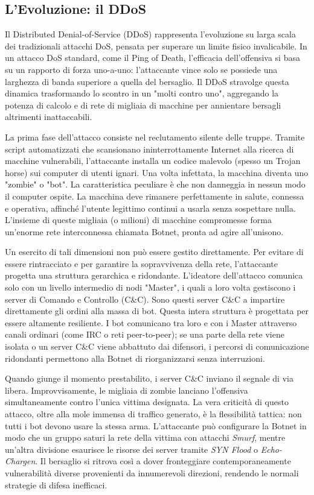 \documentclass{article}
\begin{document}
\subsection*{L'Evoluzione: il DDoS}

Il Distributed Denial-of-Service (DDoS) rappresenta l'evoluzione su larga scala dei tradizionali attacchi DoS, pensata per superare un limite fisico invalicabile. In un attacco DoS standard, come il Ping of Death, l'efficacia dell'offensiva si basa su un rapporto di forza uno-a-uno: l'attaccante vince solo se possiede una larghezza di banda superiore a quella del bersaglio. Il DDoS stravolge questa dinamica trasformando lo scontro in un "molti contro uno", aggregando la potenza di calcolo e di rete di migliaia di macchine per annientare bersagli altrimenti inattaccabili.

La prima fase dell'attacco consiste nel reclutamento silente delle truppe. Tramite script automatizzati che scansionano ininterrottamente Internet alla ricerca di macchine vulnerabili, l'attaccante installa un codice malevolo (spesso un Trojan horse) sui computer di utenti ignari. Una volta infettata, la macchina diventa uno "zombie" o "bot". La caratteristica peculiare è che non danneggia in nessun modo il computer ospite. La macchina deve rimanere perfettamente in salute, connessa e operativa, affinché l'utente legittimo continui a usarla senza sospettare nulla. L'insieme di queste migliaia (o milioni) di macchine compromesse forma un'enorme rete interconnessa chiamata Botnet, pronta ad agire all'unisono.

Un esercito di tali dimensioni non può essere gestito direttamente. Per evitare di essere rintracciato e per garantire la sopravvivenza della rete, l'attaccante progetta una struttura gerarchica e ridondante. L'ideatore dell'attacco comunica solo con un livello intermedio di nodi "Master", i quali a loro volta gestiscono i server di Comando e Controllo (C\&C). Sono questi server C\&C a impartire direttamente gli ordini alla massa di bot. Questa intera struttura è progettata per essere altamente resiliente. I bot comunicano tra loro e con i Master attraverso canali ordinari (come IRC o reti peer-to-peer); se una parte della rete viene isolata o un server C\&C viene abbattuto dai difensori, i percorsi di comunicazione ridondanti permettono alla Botnet di riorganizzarsi senza interruzioni.

Quando giunge il momento prestabilito, i server C\&C inviano il segnale di via libera. Improvvisamente, le migliaia di zombie lanciano l'offensiva simultaneamente contro l'unica vittima designata. La vera criticità di questo attacco, oltre alla mole immensa di traffico generato, è la flessibilità tattica: non tutti i bot devono usare la stessa arma. L'attaccante può configurare la Botnet in modo che un gruppo saturi la rete della vittima con attacchi \textit{Smurf}, mentre un'altra divisione esaurisce le risorse dei server tramite \textit{SYN Flood} o \textit{Echo-Chargen}. Il bersaglio si ritrova così a dover fronteggiare contemporaneamente vulnerabilità diverse provenienti da innumerevoli direzioni, rendendo le normali strategie di difesa inefficaci.
\end{document}
